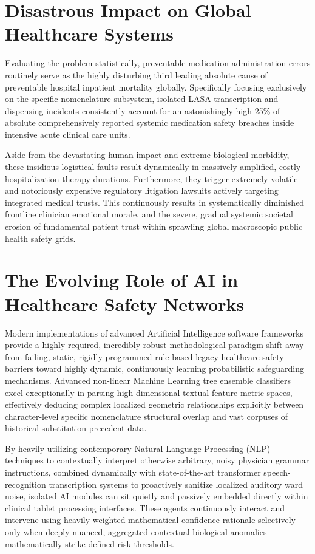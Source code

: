 \documentclass[12pt,a4paper]{report}
\begin{document}
\section{Disastrous Impact on Global Healthcare Systems}
Evaluating the problem statistically, preventable medication administration errors routinely serve as the highly disturbing third leading absolute cause of preventable hospital inpatient mortality globally. Specifically focusing exclusively on the specific nomenclature subsystem, isolated LASA transcription and dispensing incidents consistently account for an astonishingly high 25\% of absolute comprehensively reported systemic medication safety breaches inside intensive acute clinical care units.

Aside from the devastating human impact and extreme biological morbidity, these insidious logistical faults result dynamically in massively amplified, costly hospitalization therapy durations. Furthermore, they trigger extremely volatile and notoriously expensive regulatory litigation lawsuits actively targeting integrated medical trusts. This continuously results in systematically diminished frontline clinician emotional morale, and the severe, gradual systemic societal erosion of fundamental patient trust within sprawling global macroscopic public health safety grids.

\section{The Evolving Role of AI in Healthcare Safety Networks}
Modern implementations of advanced Artificial Intelligence software frameworks provide a highly required, incredibly robust methodological paradigm shift away from failing, static, rigidly programmed rule-based legacy healthcare safety barriers toward highly dynamic, continuously learning probabilistic safeguarding mechanisms. Advanced non-linear Machine Learning tree ensemble classifiers excel exceptionally in parsing high-dimensional textual feature metric spaces, effectively deducing complex localized geometric relationships explicitly between character-level specific nomenclature structural overlap and vast corpuses of historical substitution precedent data.

By heavily utilizing contemporary Natural Language Processing (NLP) techniques to contextually interpret otherwise arbitrary, noisy physician grammar instructions, combined dynamically with state-of-the-art transformer speech-recognition transcription systems to proactively sanitize localized auditory ward noise, isolated AI modules can sit quietly and passively embedded directly within clinical tablet processing interfaces. These agents continuously interact and intervene using heavily weighted mathematical confidence rationale selectively only when deeply nuanced, aggregated contextual biological anomalies mathematically strike defined risk thresholds.
\end{document}
